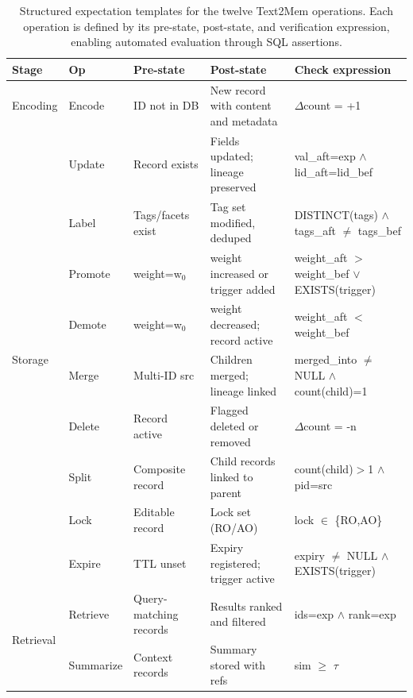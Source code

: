 \begin{table}[t]
\renewcommand{\arraystretch}{1.12}
\setlength{\tabcolsep}{4.8pt}
\centering
\footnotesize
\caption{Structured expectation templates for the twelve Text2Mem operations. 
Each operation is defined by its pre-state, post-state, and verification expression, 
enabling automated evaluation through SQL assertions.}
\begin{tabular}{l|l|l|l|l}
\hline
\textbf{Stage} & \textbf{Op} & \textbf{Pre-state} & \textbf{Post-state} & \textbf{Check expression} \\
\hline
Encoding & Encode & ID not in DB & New record with content and metadata & $\Delta$count = +1 \\ 
\hline
\multirow{9}{*}{Storage} 
& Update & Record exists & Fields updated; lineage preserved & val\_aft=exp $\wedge$ lid\_aft=lid\_bef \\
& Label & Tags/facets exist & Tag set modified, deduped & DISTINCT(tags) $\wedge$ tags\_aft $\neq$ tags\_bef \\
& Promote & weight=w$_0$ & weight increased or trigger added & weight\_aft $>$ weight\_bef $\vee$ EXISTS(trigger) \\
& Demote & weight=w$_0$ & weight decreased; record active & weight\_aft $<$ weight\_bef \\
& Merge & Multi-ID src & Children merged; lineage linked & merged\_into $\neq$ NULL $\wedge$ count(child)=1 \\
& Delete & Record active & Flagged deleted or removed & $\Delta$count = -n \\
& Split & Composite record & Child records linked to parent & count(child)$>$1 $\wedge$ pid=src \\
& Lock & Editable record & Lock set (RO/AO) & lock $\in$ \{RO,AO\} \\
& Expire & TTL unset & Expiry registered; trigger active & expiry $\neq$ NULL $\wedge$ EXISTS(trigger) \\
\hline
\multirow{2}{*}{Retrieval} 
& Retrieve & Query-matching records & Results ranked and filtered & ids=exp $\wedge$ rank=exp \\
& Summarize & Context records & Summary stored with refs & sim $\geq$ $\tau$ \\
\hline
\end{tabular}
\label{tab:expectations}
\end{table}
